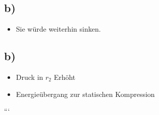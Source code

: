 

\subsection*{b)}

\begin{itemize}
    \item Sie würde weiterhin sinken.
\end{itemize}



\subsection*{b)}
\begin{itemize}
    \item Druck in $r_2$ Erhöht
    \item Energieübergang zur statischen Kompression
\end{itemize}

```